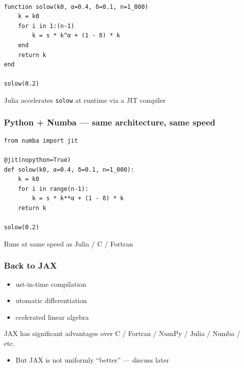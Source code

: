 \begin{frame}[fragile]
    
    \begin{verbatim}

function solow(k0, α=0.4, δ=0.1, n=1_000)
    k = k0
    for i in 1:(n-1)
        k = s * k^α + (1 - δ) * k
    end
    return k
end

solow(0.2)
    \end{verbatim}

    \vspace{0.5em}
    \vspace{0.5em}
    \vspace{0.5em}
    \vspace{0.5em}

    Julia accelerates \texttt{solow} at runtime via a JIT compiler

\end{frame}

\begin{frame}[fragile]
    \frametitle{Python + Numba --- same architecture, same speed}
    
    \begin{verbatim}
from numba import jit

@jit(nopython=True)
def solow(k0, α=0.4, δ=0.1, n=1_000):
    k = k0
    for i in range(n-1):
        k = s * k**α + (1 - δ) * k
    return k

solow(0.2)
    \end{verbatim}


    Runs at same speed as Julia / C / Fortran

\end{frame}


\begin{frame}
    \frametitle{Back to JAX}

            \vspace{0.5em}
    \begin{itemize}
        \item {}ust-in-time compilation
            \vspace{0.5em}
        \item {}utomatic differentiation
            \vspace{0.5em}
        \item {}ccelerated linear algebra
    \end{itemize}

            \vspace{0.5em}
            \vspace{0.5em}
    JAX has significant advantages over C / Fortran / NumPy / Julia / Numba /
    etc.

            \vspace{0.5em}
            \vspace{0.5em}
    \pause
    \begin{itemize}
        \item But JAX is not uniformly ``better'' --- discuss later
    \end{itemize}


\end{frame}


